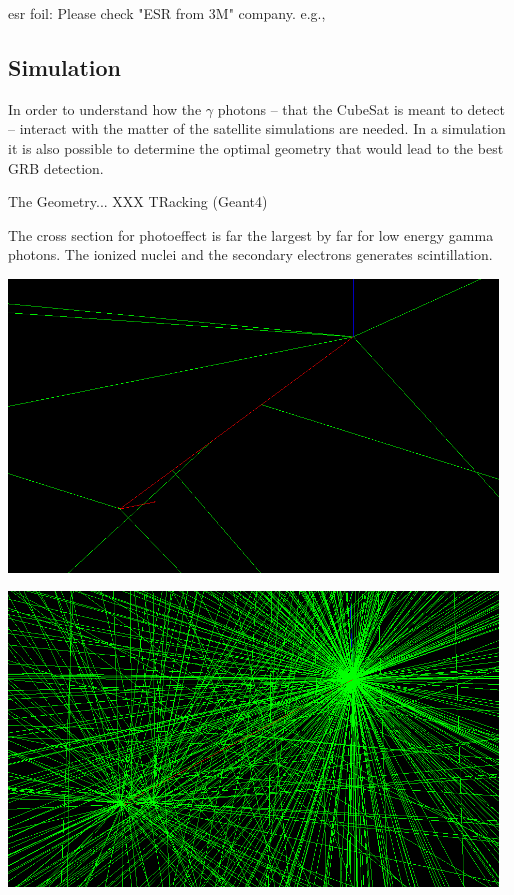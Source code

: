 \documentclass[12pt, a4paper,titlepage]{article}
\numberwithin{equation}{section}
\numberwithin{figure}{section}
\begin{document}
esr foil:
Please check "ESR from 3M" company. e.g.,

\subsection{Simulation}

In order to understand how the $\gamma$ photons -- that the CubeSat is meant to detect -- interact with the matter of the satellite simulations are needed. In a simulation it is also possible to determine the optimal geometry that would lead to the best GRB detection. 

The Geometry... XXX TRacking (Geant4) 


The cross section for photoeffect is far the largest by far for low energy gamma photons.
The ionized nuclei and the secondary electrons generates scintillation.

\includegraphics[width=130.0mm]{images/secondary.png}


\includegraphics[width=130.0mm]{images/secondary2.png}
\end{document}
